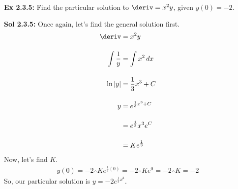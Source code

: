 \begin{tcolorbox}[example]
    \textbf{Ex 2.3.5: } Find the particular solution to $\deriv = x^2y$, given $y(0) = -2$.
\end{tcolorbox}
\begin{tcolorbox}[solution]
    \textbf{Sol 2.3.5: } Once again, let's find the general solution first. \begin{align*}
        \deriv &= x^2y \\[11pt]
        \int \dfrac{1}{y} &= \int x^2 \,dx \\[11pt]
        \ln |y| &= \dfrac{1}{3}x^3 + C \\[11pt]
        y &\begin{aligned}[t]
            & = e^{\frac{1}{3}x^3 + C} \\[11pt]
            & = e^{\frac{1}{3}}x^3e^C \\[11pt]
            & = Ke^{\frac{1}{3}}
        \end{aligned}
    \end{align*}
    Now, let's find $K$. \begin{align*}
        y(0) = -2 \therefore Ke^{\frac{1}{3}(0)} = -2 \therefore Ke^0 = -2 \therefore K = -2
    \end{align*}
    So, our particular solution is $\boxed{y = -2e^{\frac{1}{3}x^3}}$.
\end{tcolorbox} \vspace{11pt}

